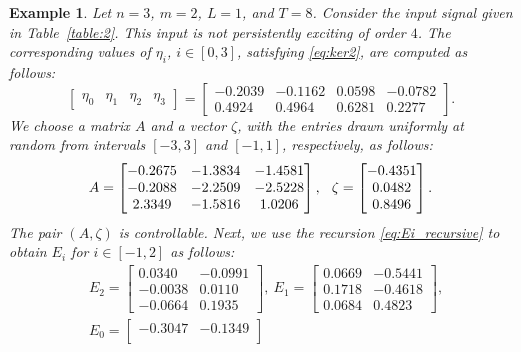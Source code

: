 \documentclass[journal,twoside,web]{ieeecolor}
\newtheorem{example}[theorem]{Example}
\begin{document}
\begin{example}
\label{ex:sec:V-2}
Let $n=3$, $m=2$, $L=1$, and $T=8$. Consider the input signal given in Table~\ref{table:2}. This input is not persistently exciting of order $4$. The corresponding values of $\eta_i$, $i\in[0,3]$, satisfying \eqref{eq:ker2}, are computed as follows:
\begin{equation}
\begin{bmatrix}
\eta_0 \!\!&\!\! \eta_1 \!\!&\!\! \eta_2 \!\!&\!\! \eta_3
\end{bmatrix}\!\!=\!\!\begin{bmatrix}
-0.2039 & -0.1162 & 0.0598 & -0.0782 \\
0.4924 & 0.4964 & 0.6281 & 0.2277
\end{bmatrix}\!.
\end{equation}
We choose a matrix $A$ and a vector $\zeta$, with the entries drawn uniformly at random from intervals $[-3,3]$ and $[-1,1]$, respectively, as follows:
\begin{equation}
A=\begin{bmatrix}
-0.2675 & -1.3834 & -1.4581 \\
-0.2088 & -2.2509 & -2.5228 \\
2.3349 &  -1.5816 & 1.0206
\end{bmatrix},\hspace{0.25 cm} \zeta=\begin{bmatrix}
-0.4351 \\ 0.0482 \\ 0.8496
\end{bmatrix}.
\end{equation}
The pair $(A,\zeta)$ is controllable. Next, we use the recursion \eqref{eq:Ei_recursive} to obtain $E_{i}$ for $i\in[-1,2]$ as follows:
\begin{equation}
\begin{split}
&E_2\!=\!\begin{bmatrix}
0.0340 & -0.0991 \\
-0.0038 & 0.0110 \\
-0.0664 & 0.1935
\end{bmatrix}\!\!,\ E_1=\begin{bmatrix}
0.0669 & -0.5441 \\
0.1718 & -0.4618 \\
0.0684 & 0.4823
\end{bmatrix}\!\!, \\
&E_0\!=\!\begin{bmatrix}
-0.3047 & -0.1349 \\

\end{bmatrix}
\end{split}
\end{equation}
\end{example}
\end{document}
